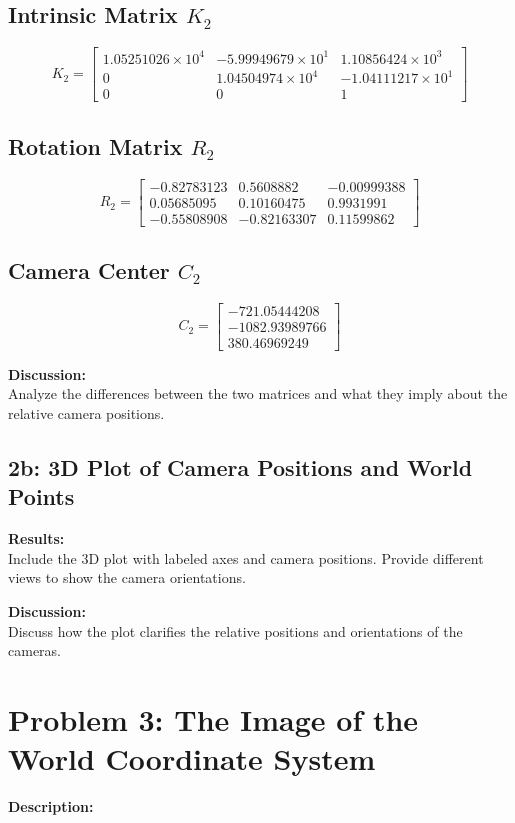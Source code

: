 \documentclass{article}
\begin{document}
\subsection*{Intrinsic Matrix \( K_2 \)}
\[
K_2 =
\begin{bmatrix}
1.05251026 \times 10^4 & -5.99949679 \times 10^1 & 1.10856424 \times 10^3 \\
0 & 1.04504974 \times 10^4 & -1.04111217 \times 10^1 \\
0 & 0 & 1
\end{bmatrix}
\]

\subsection*{Rotation Matrix \( R_2 \)}
\[
R_2 =
\begin{bmatrix}
-0.82783123 & 0.5608882 & -0.00999388 \\
0.05685095 & 0.10160475 & 0.9931991 \\
-0.55808908 & -0.82163307 & 0.11599862
\end{bmatrix}
\]

\subsection*{Camera Center \( C_2 \)}
\[
C_2 =
\begin{bmatrix}
-721.05444208 \\
-1082.93989766 \\
380.46969249
\end{bmatrix}
\]

\textbf{Discussion:} \\
Analyze the differences between the two matrices and what they imply about the relative camera positions.

\subsection{2b: 3D Plot of Camera Positions and World Points}
\textbf{Results:} \\
Include the 3D plot with labeled axes and camera positions. Provide different views to show the camera orientations.

\textbf{Discussion:} \\
Discuss how the plot clarifies the relative positions and orientations of the cameras.

\newpage
\section{Problem 3: The Image of the World Coordinate System}
\textbf{Description:} \\
\end{document}

